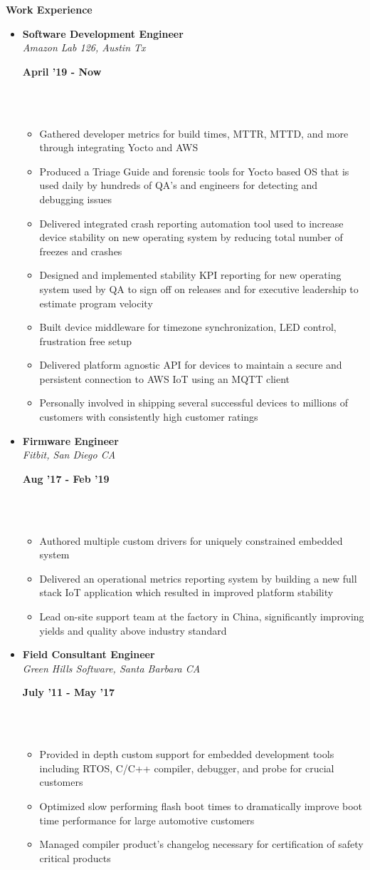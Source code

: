 \documentclass[a4paper,11pt]{article}
\newcommand{\isep}{0 pt}
\newcommand{\resheading}[1]{{\small \colorbox{mygrey}{\begin{minipage}{0.975\textwidth}{\textbf{#1 \vphantom{p\^{E}}}}\end{minipage}}}}
\newcommand{\workexp}[4]{
\begin{minipage}[t]{7cm}
\begin{flushleft}
\textbf{#1} \\
\indent \emph{#2}\\
\end{flushleft}
\end{minipage}
\hfill
\begin{minipage}[t]{7cm}
\begin{flushright}
\textbf{#3} \\
\indent #4 \\
\end{flushright}
\end{minipage}
\\[-0.10in]
}
\begin{document}
\resheading{\textbf{Work Experience}}
\begin{itemize}
\item
\workexp{Software Development Engineer}{Amazon Lab 126, Austin Tx}{April '19 - Now}{}
    \begin{itemize}\itemsep \isep
    	\item Gathered developer metrics for build times, MTTR, MTTD, and more through integrating Yocto and AWS
    	\item Produced a Triage Guide and forensic tools for Yocto based OS that is used daily by hundreds of QA's and engineers for detecting and debugging issues
    	\item Delivered integrated crash reporting automation tool used to increase device stability on new operating system by reducing total number of freezes and crashes
    	\item Designed and implemented stability KPI reporting for new operating system used by QA to sign off on releases and for executive leadership to estimate program velocity
    	\item Built device middleware for timezone synchronization, LED control, frustration free setup
        \item Delivered platform agnostic API for devices to maintain a secure and persistent connection to AWS IoT using an MQTT client
        \item Personally involved in shipping several successful devices to millions of customers with consistently high customer ratings
    \end{itemize}

\item
\workexp{Firmware Engineer}{Fitbit, San Diego CA}{Aug '17 - Feb '19}{}
    \begin{itemize}\itemsep \isep
        \item Authored multiple custom drivers for uniquely constrained embedded system
        \item Delivered an operational metrics reporting system by building a new full stack IoT application which resulted in improved platform stability
        \item Lead on-site support team at the factory in China, significantly improving yields and quality above industry standard
    \end{itemize}

\item
\workexp{Field Consultant Engineer}{Green Hills Software, Santa Barbara CA}{July '11 - May '17}{}
	\begin{itemize}\itemsep \isep
        \item Provided in depth custom support for embedded development tools including RTOS, C/C++ compiler, debugger, and probe for crucial customers
        \item Optimized slow performing flash boot times to dramatically improve boot time performance for large automotive customers
        \item Managed compiler product's changelog necessary for certification of safety critical products
	\end{itemize}


\end{itemize}
\end{document}
